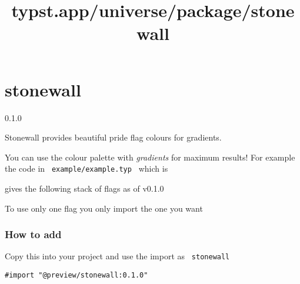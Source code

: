\title{typst.app/universe/package/stonewall}

\label{banner}
\section{stonewall}\label{stonewall}

{ 0.1.0 }

Stonewall provides beautiful pride flag colours for gradients.

\label{readme}
You can use the colour palette with \emph{gradients} for maximum
results! For example the code in \texttt{\ example/example.typ\ } which
is

\begin{Shaded}
\begin{Highlighting}[]



\NormalTok{  ))}
\NormalTok{)}
\end{Highlighting}
\end{Shaded}

gives the following stack of flags as of v0.1.0

To use only one flag you only import the one you want

\subsubsection{How to add}\label{how-to-add}

Copy this into your project and use the import as \texttt{\ stonewall\ }

\begin{verbatim}
#import "@preview/stonewall:0.1.0"
\end{verbatim}




